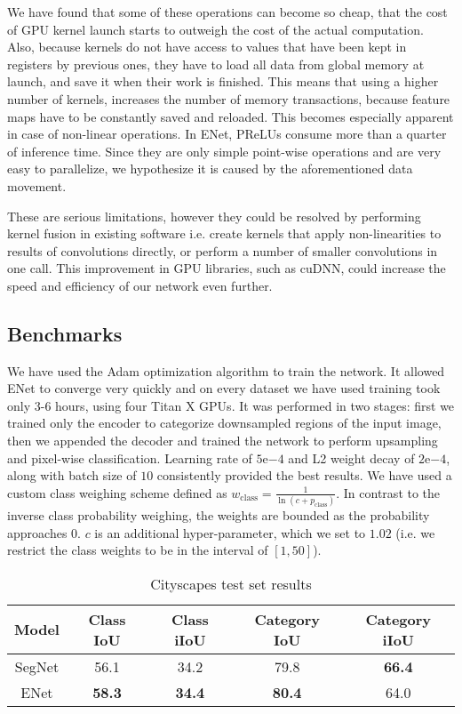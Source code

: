 \documentclass{article}
\begin{document}
We have found that some of these operations can become so cheap, that the cost of GPU kernel launch starts to outweigh the cost of the actual computation.
Also, because kernels do not have access to values that have been kept in registers by previous ones, they have to load all data from global memory at launch, and save it when their work is finished.
This means that using a higher number of kernels, increases the number of memory transactions, because feature maps have to be constantly saved and reloaded.
This becomes especially apparent in case of non-linear operations.
In ENet, PReLUs consume more than a quarter of inference time.
Since they are only simple point-wise operations and are very easy to parallelize, we hypothesize it is caused by the aforementioned data movement.

These are serious limitations, however they could be resolved by performing kernel fusion in existing software i.e. create kernels that apply non-linearities to results of convolutions directly, or perform a number of smaller convolutions in one call.
This improvement in GPU libraries, such as cuDNN, could increase the speed and efficiency of our network even further.

\subsection{Benchmarks}

We have used the Adam optimization algorithm \cite{diederik14} to train the network.
It allowed ENet to converge very quickly and on every dataset we have used training took only 3-6 hours, using four Titan X GPUs.
It was performed in two stages: first we trained only the encoder to categorize downsampled regions of the input image, then we appended the decoder and trained the network to perform upsampling and pixel-wise classification.
Learning rate of $5\mathrm{e}{-4}$ and L2 weight decay of $2\mathrm{e}{-4}$, along with batch size of $10$ consistently provided the best results.
We have used a custom class weighing scheme defined as $w_{\mathrm{class}} = \frac{1}{\ln(c + p_{\mathrm{class}})}$.
In contrast to the inverse class probability weighing, the weights are bounded as the probability approaches $0$.
$c$ is an additional hyper-parameter, which we set to $1.02$ (i.e. we restrict the class weights to be in the interval of $\left[1, 50\right]$).

\begin{table}[htb]
  \small
  \caption{Cityscapes test set results}
  \vspace{0.05in}
  \label{tab:cityscape}
  \centering
  \begin{tabular}{ c c c c c }
    \toprule
    Model           &Class IoU      &Class iIoU     &Category IoU  &Category iIoU \\
    \midrule
    SegNet          &56.1           &34.2           &79.8          &\textbf{66.4} \\
    ENet            &\textbf{58.3}  &\textbf{34.4}  &\textbf{80.4} &64.0          \\
    \bottomrule
  \end{tabular}
\end{table}
\end{document}
